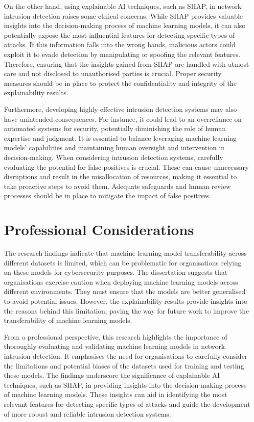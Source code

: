 On the other hand, using explainable AI techniques, such as SHAP, in network intrusion detection raises some ethical concerns. While SHAP provides valuable insights into the decision-making process of machine learning models, it can also potentially expose the most influential features for detecting specific types of attacks. If this information falls into the wrong hands, malicious actors could exploit it to evade detection by manipulating or spoofing the relevant features. Therefore, ensuring that the insights gained from SHAP are handled with utmost care and not disclosed to unauthorised parties is crucial. Proper security measures should be in place to protect the confidentiality and integrity of the explainability results.

Furthermore, developing highly effective intrusion detection systems may also have unintended consequences. For instance, it could lead to an overreliance on automated systems for security, potentially diminishing the role of human expertise and judgment. It is essential to balance leveraging machine learning models' capabilities and maintaining human oversight and intervention in decision-making. When considering intrusion detection systems, carefully evaluating the potential for false positives is crucial. These can cause unnecessary disruptions and result in the misallocation of resources, making it essential to take proactive steps to avoid them. Adequate safeguards and human review processes should be in place to mitigate the impact of false positives.

\section{Professional Considerations}
The research findings indicate that machine learning model transferability across different datasets is limited, which can be problematic for organisations relying on these models for cybersecurity purposes. The dissertation suggests that organisations exercise caution when deploying machine learning models across different environments. They must ensure that the models are better generalised to avoid potential issues. However, the explainability results provide insights into the reasons behind this limitation, paving the way for future work to improve the transferability of machine learning models.

From a professional perspective, this research highlights the importance of thoroughly evaluating and validating machine learning models in network intrusion detection. It emphasises the need for organisations to carefully consider the limitations and potential biases of the datasets used for training and testing these models. The findings underscore the significance of explainable AI techniques, such as SHAP, in providing insights into the decision-making process of machine learning models. These insights can aid in identifying the most relevant features for detecting specific types of attacks and guide the development of more robust and reliable intrusion detection systems.


